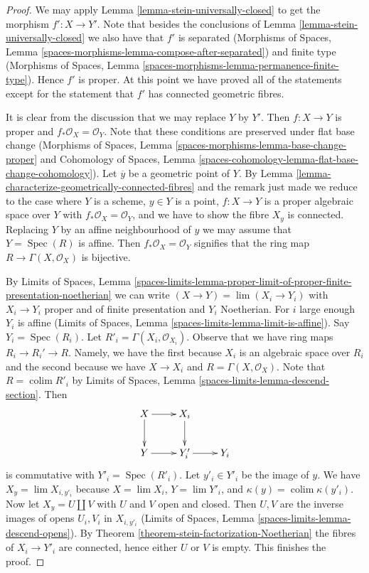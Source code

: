 \documentclass[10pt,a4paper]{amsart}
\theoremstyle{plain}
\theoremstyle{definition}
\theoremstyle{remark}
\numberwithin{equation}{subsection}
\def\lim{\mathop{\mathrm{lim}}\nolimits}
\def\colim{\mathop{\mathrm{colim}}\nolimits}
\def\Spec{\mathop{\mathrm{Spec}}}
\begin{document}
\begin{proof}
We may apply Lemma \ref{lemma-stein-universally-closed} to get the
morphism $f' : X \to Y'$.
Note that besides the
conclusions of Lemma \ref{lemma-stein-universally-closed} we
also have that $f'$ is separated
(Morphisms of Spaces, Lemma
\ref{spaces-morphisms-lemma-compose-after-separated})
and finite type
(Morphisms of Spaces, Lemma
\ref{spaces-morphisms-lemma-permanence-finite-type}).
Hence $f'$ is proper. At this point we have proved all of the
statements except for the statement
that $f'$ has connected geometric fibres.

\medskip\noindent
It is clear from the discussion that we may replace $Y$ by $Y'$. 
Then $f : X \to Y$ is proper and $f_*\mathcal{O}_X = \mathcal{O}_Y$.
Note that these conditions are preserved under flat base change
(Morphisms of Spaces, Lemma \ref{spaces-morphisms-lemma-base-change-proper}
and
Cohomology of Spaces, Lemma
\ref{spaces-cohomology-lemma-flat-base-change-cohomology}).
Let $\overline{y}$ be a geometric point of $Y$. By
Lemma \ref{lemma-characterize-geometrically-connected-fibres}
and the remark just made we reduce to the case where $Y$ is a
scheme, $y \in Y$ is a point, $f : X \to Y$ is a proper algebraic
space over $Y$ with $f_*\mathcal{O}_X = \mathcal{O}_Y$,
and we have to show the fibre $X_y$ is connected.
Replacing $Y$ by an affine neighbourhood of $y$ we may
assume that $Y = \Spec(R)$ is affine. Then $f_*\mathcal{O}_X = \mathcal{O}_Y$
signifies that the ring map
$R \to \Gamma(X, \mathcal{O}_X)$ is bijective.

\medskip\noindent
By Limits of Spaces, Lemma
\ref{spaces-limits-lemma-proper-limit-of-proper-finite-presentation-noetherian}
we can write $(X \to Y) = \lim (X_i \to Y_i)$ with $X_i \to Y_i$
proper and of finite presentation and $Y_i$ Noetherian. For $i$ large
enough $Y_i$ is affine (Limits of Spaces, Lemma
\ref{spaces-limits-lemma-limit-is-affine}).
Say $Y_i = \Spec(R_i)$. Let $R'_i = \Gamma(X_i, \mathcal{O}_{X_i})$.
Observe that we have ring maps $R_i \to R_i' \to R$. Namely, we have
the first because $X_i$ is an algebraic space over $R_i$ and the second because
we have $X \to X_i$ and $R = \Gamma(X, \mathcal{O}_X)$. Note that
$R = \colim R'_i$ by Limits of Spaces, Lemma
\ref{spaces-limits-lemma-descend-section}.
Then 
$$
\xymatrix{
X \ar[d]  \ar[r] & X_i \ar[d] \\
Y \ar[r] & Y'_i \ar[r] & Y_i
}
$$
is commutative with $Y'_i = \Spec(R'_i)$.
Let $y'_i \in Y'_i$ be the image of $y$.
We have $X_y = \lim X_{i, y'_i}$ because $X = \lim X_i$,
$Y = \lim Y'_i$, and $\kappa(y) = \colim \kappa(y'_i)$.
Now let $X_y = U \amalg V$ with $U$ and $V$ open and closed.
Then $U, V$ are the inverse images of opens $U_i, V_i$ in $X_{i, y'_i}$
(Limits of Spaces, Lemma \ref{spaces-limits-lemma-descend-opens}).
By Theorem \ref{theorem-stein-factorization-Noetherian} the fibres
of $X_i \to Y'_i$ are connected, hence either $U$ or $V$ is empty.
This finishes the proof.
\end{proof}
\end{document}
